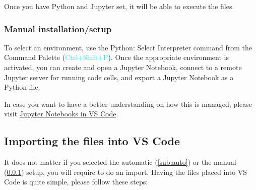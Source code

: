 \documentclass{assignment}
\begin{document}
Once you have Python and Jupyter set, it will be able to execute the files.


\subsubsection{Manual installation/setup}
\label{sub:manual}
To select an environment, use the Python: Select Interpreter command from the Command Palette (\textcolor{cyan}{Ctrl+Shift+P}). Once the appropriate environment is activated, you can create and open a Jupyter Notebook, connect to a remote Jupyter server for running code cells, and export a Jupyter Notebook as a Python file.

In case you want to have a better understanding on how this is managed, please visit \href{https://code.visualstudio.com/docs/datascience/jupyter-notebooks}{Jupyter Notebooks in VS Code}.

\subsection{Importing the files into VS Code}

It does not matter if you selected the automatic (\ref{sub:auto}) or the manual (\ref{sub:manual}) setup, you will require to do an import. Having the files placed into VS Code is quite simple, please follow these steps:
\end{document}
